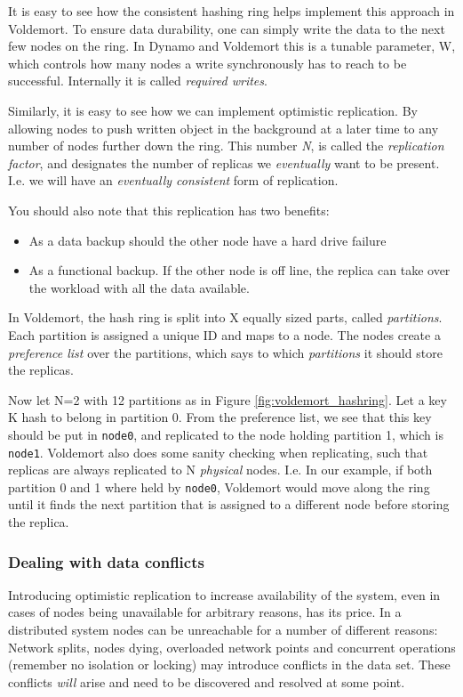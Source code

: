 It is easy to see how the consistent hashing ring helps implement this approach in Voldemort.
To ensure data durability, one can simply write the data to the next few nodes on the ring. In Dynamo and Voldemort this is a tunable parameter, W, which controls how many nodes a write synchronously has to reach to be successful. 
Internally it is called \emph{required writes}.

Similarly, it is easy to see how we can implement optimistic replication.
By allowing nodes to push written object in the background at a later time to any number of nodes further down the ring.
This number \emph{N}, is called the \emph{replication factor}, and designates the number of replicas we \emph{eventually} want to be present.
I.e. we will have an \emph{eventually consistent} form of replication.

You should also note that this replication has two benefits: 
\begin{itemize}
	\item As a data backup should the other node have a hard drive failure
	\item As a functional backup. If the other node is off line, the replica can take over the workload with all the data available.
\end{itemize}

In Voldemort, the hash ring is split into X equally sized parts, called \emph{partitions}. Each partition is assigned a unique ID and maps to a node.
The nodes create a \emph{preference list} over the partitions, which says to which \emph{partitions} it should store the replicas.

Now let N=2 with 12 partitions as in Figure \ref{fig:voldemort_hashring}. 
Let a key K hash to belong in partition 0. From the preference list, we see that this key should be put in \texttt{node0}, and replicated to the node holding partition 1, which is \texttt{node1}.
Voldemort also does some sanity checking when replicating, such that replicas are always replicated to N \emph{physical} nodes. 
I.e. In our example, if both partition 0 and 1 where held by \texttt{node0}, Voldemort would move along the ring until it finds the next partition that is assigned to a different node before storing the replica.

\subsubsection{Dealing with data conflicts}
Introducing optimistic replication to increase availability of the system, even in cases of nodes being unavailable for arbitrary reasons, has its price. 
In a distributed system nodes can be unreachable for a number of different reasons:
Network splits, nodes dying, overloaded network points and concurrent operations (remember no isolation or locking) may introduce conflicts in the data set.
These conflicts \emph{will} arise and need to be discovered and resolved at some point.

